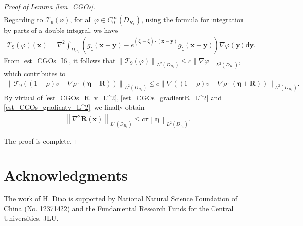 \documentclass[11pt,reqno,oneside]{amsart}
\theoremstyle{definition}
\theoremstyle{remark}
\numberwithin{equation}{section}
\numberwithin{equation}{section}
\theoremstyle{remark}
\begin{document}
\begin{proof}[Proof of Lemma \ref{lem_CGOs}]
\begin{align*}
	\end{align*}
	Regarding to $ \mathcal{T}_9\left(\varphi\right) $, for all $ \varphi \in C^{\infty}_0 \left(D_{R_1}\right) $, using the formula for integration by parts of a double integral, we have
	\begin{align*} 
		\mathcal{T}_9\left(\varphi\right) \left(\mathbf{x}\right) = \nabla^2 \int_{D_{R_1}} \left(g_{\bm{\zeta}}\left(\mathbf{x} - \mathbf{y}\right) - e^{\left(\tilde{\bm{\zeta}}-\bm{\zeta}\right) \cdot \left(\mathbf{x} - \mathbf{y}\right)} g_{\tilde{\bm{\zeta}}}\left(\mathbf{x} - \mathbf{y}\right)\right) \nabla \varphi \left(\mathbf{y}\right) \mathrm{d} \mathbf{y}.
	\end{align*}
	From \eqref{est_CGOs_I6}, it follows that $ \left\| \mathcal{T}_9\left(\varphi\right) \right\|_{L^2\left(D_{R_1}\right)} \leqslant c \left\| \nabla \varphi \right\|_{L^2\left(D_{R_1}\right)} $, which contributes to
	\begin{align*} 
		\left\| \mathcal{T}_9 \left(\left(1-\rho\right) v - \nabla \rho \cdot \left(\bm{\eta}+\mathbf{R}\right)\right) \right\|_{L^2\left(D_{R_1}\right)} \leqslant c \left\| \nabla \left(\left(1-\rho\right) v - \nabla \rho \cdot \left(\bm{\eta}+\mathbf{R}\right)\right) \right\|_{L^2\left(D_{R_1}\right)} .
	\end{align*}
	By virtual of \eqref{est_CGOs_R_v_L^2}, \eqref{est_CGOs_gradientR_L^2} and \eqref{est_CGOs_gradientv_L^2}, we finally obtain 
	\begin{align*}
		\left\| \nabla^2\mathbf{R}\left(\mathbf{x}\right) \right\|_{L^2\left(D_{R_1}\right)} \leqslant c\tau \left\| \bm{\eta} \right\|_{L^2\left(D_{R_1}\right)}.
	\end{align*}	

	The proof is complete.
\end{proof}


\section*{Acknowledgments}

The work of H. Diao is supported by National Natural Science Foundation of China (No. 12371422) and the Fundamental Research Funds for the Central Universities, JLU.
\end{document}
